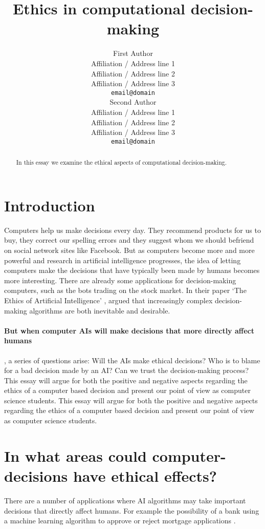 \documentclass[11pt]{article}
\title{Ethics in computational decision-making}
\author{First Author \\
  Affiliation / Address line 1 \\
  Affiliation / Address line 2 \\
  Affiliation / Address line 3 \\
  {\tt email@domain} \\\And
  Second Author \\
  Affiliation / Address line 1 \\
  Affiliation / Address line 2 \\
  Affiliation / Address line 3 \\
  {\tt email@domain} \\}
\date{}
\begin{document}
\maketitle
\begin{abstract}
  In this essay we examine the ethical aspects of computational decision-making.
\end{abstract}

\section{Introduction}
Computers help us make decisions every day. They recommend products for us to
buy, they correct our spelling errors and they suggest whom we should befriend
on social network sites like Facebook. But as computers become more and more
powerful and research in artificial intelligence progresses, the idea of letting
computers make the decisions that have typically been made by humans becomes
more interesting. There are already some applications for decision-making
computers, such as the bots trading on the stock market. In their paper ‘The Ethics of Artificial Intelligence’ \citeyear{bostrom2013ethics}, \citeauthor{bostrom2013ethics} argued that increasingly complex decision-making algorithms are both inevitable and desirable. 

\paragraph{But when computer AIs will make decisions that more directly affect humans}, a series of questions
arise: Will the AIs make ethical decisions? Who is to blame for a bad decision
made by an AI? Can we trust the decision-making process? This essay will argue 
for both the positive and negative aspects regarding the ethics of a computer 
based decision and present our point of view as computer science students. 
This essay will argue for both the positive and negative aspects regarding the ethics of a computer based decision and present our point of view as computer science students. 

\section{In what areas could computer-decisions have ethical effects?}
There are a number of applications where AI algorithms may take important decisions that directly
affect humans. For example the possibility of
a bank using a machine learning algorithm to approve or reject mortgage
applications \cite{bostrom2013ethics}. 
\end{document}
